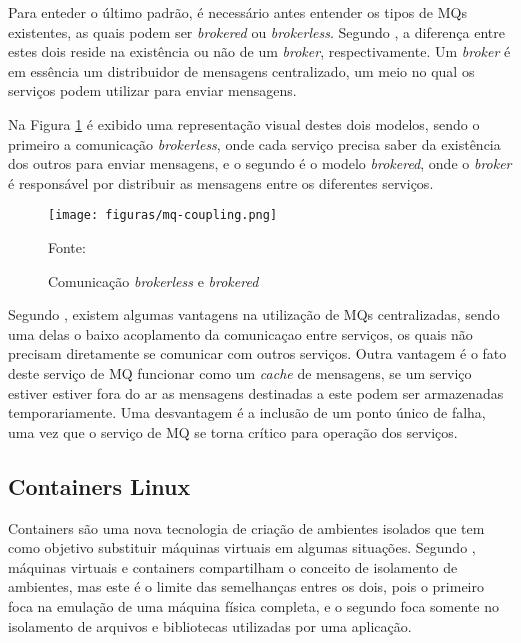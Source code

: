 Para enteder o último padrão, é necessário antes entender os tipos de \acp{MQ}
existentes, as quais podem ser \emph{brokered} ou \emph{brokerless}. Segundo
, a diferença entre estes dois reside na existência
ou não de um \emph{broker}, respectivamente. Um \emph{broker} é em essência um
distribuidor de mensagens centralizado, um meio no qual os serviços podem
utilizar para enviar mensagens.

Na Figura \ref{fig:mq-coupling} é exibido uma representação visual destes dois
modelos, sendo o primeiro a comunicação \emph{brokerless}, onde cada serviço
precisa saber da existência dos outros para enviar mensagens, e o segundo é
o modelo \emph{brokered}, onde o \emph{broker} é responsável por distribuir
as mensagens entre os diferentes serviços.

\begin{figure}[H]
	\centering
	\caption{Comunicação \emph{brokerless} e \emph{brokered}}
	\texttt{[image: figuras/mq-coupling.png]}

	\label{fig:mq-coupling}
	\footnotesize Fonte: 
\end{figure}

Segundo , existem algumas vantagens na utilização
de \acp{MQ} centralizadas, sendo uma delas o baixo acoplamento da comunicaçao
entre serviços, os quais não precisam diretamente se comunicar com outros
serviços. Outra vantagem é o fato deste serviço de \ac{MQ} funcionar como
um \emph{cache} de mensagens, se um serviço estiver estiver fora do ar as
mensagens destinadas a este podem ser armazenadas temporariamente. Uma
desvantagem é a inclusão de um ponto único de falha, uma vez que o serviço
de \ac{MQ} se torna crítico para operação dos serviços.

\subsection{Containers Linux}

Containers são uma nova tecnologia de criação de ambientes isolados que tem
como objetivo substituir máquinas virtuais em algumas situações. Segundo
, máquinas virtuais e containers compartilham o
conceito de isolamento de ambientes, mas este é o limite das semelhanças
entres os dois, pois o primeiro foca na emulação de uma máquina física
completa, e o segundo foca somente no isolamento de arquivos e bibliotecas
utilizadas por uma aplicação.

